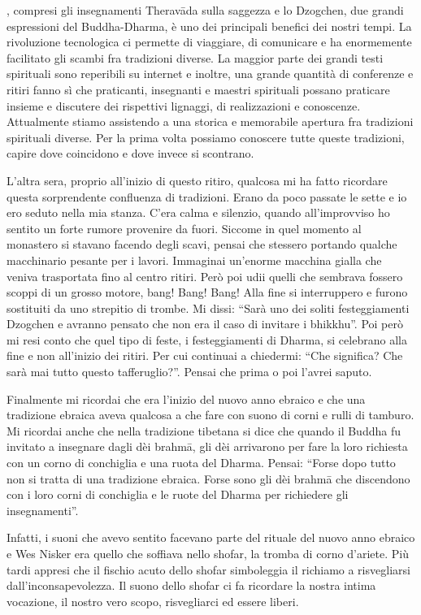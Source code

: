 
, compresi gli insegnamenti Theravāda sulla saggezza e lo Dzogchen, due grandi espressioni del Buddha-Dharma, è uno dei principali benefici dei nostri tempi. La rivoluzione tecnologica ci permette di viaggiare, di comunicare e ha enormemente facilitato gli scambi fra tradizioni diverse. La maggior parte dei grandi testi spirituali sono reperibili su internet e inoltre, una grande quantità di conferenze e ritiri fanno sì che praticanti, insegnanti e maestri spirituali possano praticare insieme e discutere dei rispettivi lignaggi, di realizzazioni e conoscenze. Attualmente stiamo assistendo a una storica e memorabile apertura fra tradizioni spirituali diverse. Per la prima volta possiamo conoscere tutte queste tradizioni, capire dove coincidono e dove invece si scontrano.

L'altra sera, proprio all'inizio di questo ritiro, qualcosa mi ha fatto ricordare questa sorprendente confluenza di tradizioni. Erano da poco passate le sette e io ero seduto nella mia stanza. C'era calma e silenzio, quando all'improvviso ho sentito un forte rumore provenire da fuori. Siccome in quel momento al monastero si stavano facendo degli scavi, pensai che stessero portando qualche macchinario pesante per i lavori. Immaginai un'enorme macchina gialla che veniva trasportata fino al centro ritiri. Però poi udii quelli che sembrava fossero scoppi di un grosso motore, bang! Bang! Bang! Alla fine si interruppero e furono sostituiti da uno strepitio di trombe. Mi dissi: ``Sarà uno dei soliti festeggiamenti Dzogchen e avranno pensato che non era il caso di invitare i bhikkhu''. Poi però mi resi conto che quel tipo di feste, i festeggiamenti di Dharma, si celebrano alla fine e non all'inizio dei ritiri. Per cui continuai a chiedermi: ``Che significa? Che sarà mai tutto questo tafferuglio?''. Pensai che prima o poi l'avrei saputo. 

Finalmente mi ricordai che era l'inizio del nuovo anno ebraico e che una tradizione ebraica aveva qualcosa a che fare con suono di corni e rulli di tamburo. Mi ricordai anche che nella tradizione tibetana si dice che quando il Buddha fu invitato a insegnare dagli dèi brahmā, gli dèi arrivarono per fare la loro richiesta con un corno di conchiglia e una ruota del Dharma. Pensai: ``Forse dopo tutto non si tratta di una tradizione ebraica. Forse sono gli dèi brahmā che discendono con i loro corni di conchiglia e le ruote del Dharma per richiedere gli insegnamenti''.

Infatti, i suoni che avevo sentito facevano parte del rituale del nuovo anno ebraico e Wes Nisker era quello che soffiava nello shofar, la tromba di corno d'ariete. Più tardi appresi che il fischio acuto dello shofar simboleggia il richiamo a risvegliarsi dall'inconsapevolezza. Il suono dello shofar ci fa ricordare la nostra intima vocazione, il nostro vero scopo, risvegliarci ed essere liberi.

